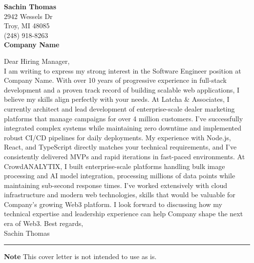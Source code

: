 
\noindent \textbf{Sachin Thomas} \\
2942 Wessels Dr \\
Troy, MI 48085 \\
(248) 918-8263 \\
\vspace{4pt}
\noindent \textbf{Company Name}
\newline

\noindent Dear Hiring Manager, \\

\noindent I am writing to express my strong interest in the Software Engineer position at Company Name. With over 10 years of progressive experience in full-stack development and a proven track record of building scalable web applications, I believe my skills align perfectly with your needs. 
\newline\newline
\noindent At Latcha \& Associates, I currently architect and lead development of enterprise-scale dealer marketing platforms that manage campaigns for over 4 million customers. I've successfully integrated complex systems while maintaining zero downtime and implemented robust CI/CD pipelines for daily deployments. My experience with Node.js, React, and TypeScript directly matches your technical requirements, and I've consistently delivered MVPs and rapid iterations in fast-paced environments.
\newline\newline
\noindent At CrowdANALYTIX, I built enterprise-scale platforms handling bulk image processing and AI model integration, processing millions of data points while maintaining sub-second response times. I've worked extensively with cloud infrastructure and modern web technologies, skills that would be valuable for Company's growing Web3 platform.
\newline\newline
I look forward to discussing how my technical expertise and leadership experience can help Company shape the next era of Web3.
\newline\newline
\noindent Best regards,\\
\noindent Sachin Thomas

\vspace{24pt}
\hrule
\vspace{10pt}
\small \color{rulered} {\textbf{Note} This cover letter is not intended to use as is.}
